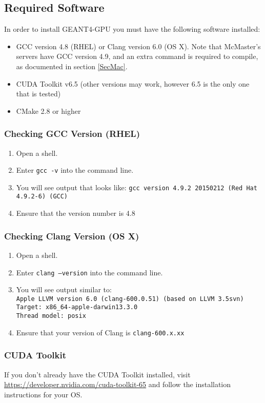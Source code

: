 \documentclass[12pt]{article}
\begin{document}
\subsection{Required Software} %
In order to install GEANT4-GPU you must have the following software installed:
\begin{itemize}
\item GCC version 4.8 (RHEL) or Clang version 6.0 (OS X). Note that McMaster's servers have GCC version 4.9, and an extra command is required to compile, as documented in section \ref{SecMac}.
\item CUDA Toolkit v6.5 (other versions may work, however 6.5 is the only one that is tested)
\item CMake 2.8 or higher
\end{itemize}

\subsubsection{Checking GCC Version (RHEL)}
\begin{enumerate}
\item Open a shell.
\item Enter \texttt{gcc -v} into the command line.
\item You will see output that looks like:
\texttt{gcc version 4.9.2 20150212 (Red Hat 4.9.2-6) (GCC)}
\item Ensure that the version number is 4.8
\end{enumerate}

\subsubsection{Checking Clang Version (OS X)}
\begin{enumerate}
\item Open a shell.
\item Enter \texttt{clang --version} into the command line.
\item You will see output similar to: \\
\texttt{Apple LLVM version 6.0 (clang-600.0.51) (based on LLVM 3.5svn)}\\
\texttt{Target: x86\_64-apple-darwin13.3.0}\\
\texttt{Thread model: posix}
\item Ensure that your version of Clang is \texttt{clang-600.x.xx}
\end{enumerate}

\subsubsection{CUDA Toolkit}
If you don't already have the CUDA Toolkit installed, visit \url{https://developer.nvidia.com/cuda-toolkit-65} and follow the installation instructions for your OS.\\
\end{document}
